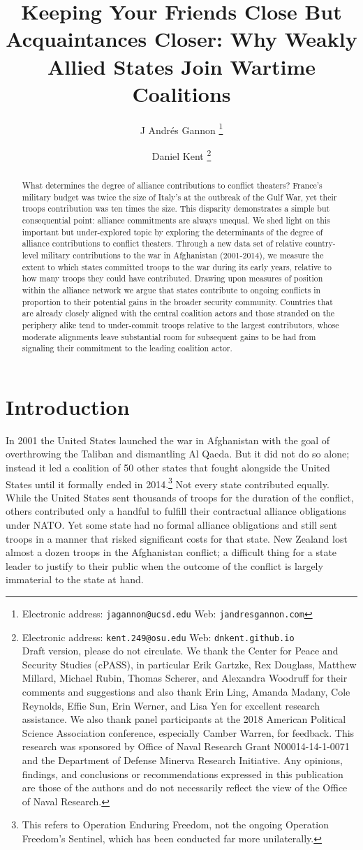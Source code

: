 \documentclass[12pt,letterpaper]{article}
\title{Keeping Your Friends Close But Acquaintances Closer: Why Weakly Allied States Join Wartime Coalitions}
\author{J Andr\'{e}s Gannon%
	\thanks{Electronic address: \texttt{jagannon@ucsd.edu} Web: \texttt{jandresgannon.com}}}
\affil{Department of Political Science \\ University of California, San Diego}
\author{Daniel Kent%
	\thanks{Electronic address: \texttt{kent.249@osu.edu} Web: \texttt{dnkent.github.io} \\ Draft version, please do not circulate. We thank the Center for Peace and Security Studies (cPASS), in particular Erik Gartzke, Rex Douglass, Matthew Millard, Michael Rubin, Thomas Scherer, and Alexandra Woodruff for their comments and suggestions and also thank Erin Ling, Amanda Madany, Cole Reynolds, Effie Sun, Erin Werner, and Lisa Yen for excellent research assistance. We also thank panel participants at the 2018 American Political Science Association conference, especially Camber Warren, for feedback. This research was sponsored by Office of Naval Research Grant N00014-14-1-0071 and the Department of Defense Minerva Research Initiative. Any opinions, findings, and conclusions or recommendations expressed in this publication are those of the authors and do not necessarily reflect the view of the Office of Naval Research.}}
\affil{Department of Political Science \\ The Ohio State University}
\begin{document}
\maketitle

\begin{abstract}
What determines the degree of alliance contributions to conflict theaters? France's military budget was twice the size of Italy's at the outbreak of the Gulf War, yet their troops contribution was ten times the size. This disparity demonstrates a simple but consequential point: alliance commitments are always unequal. We shed light on this important but under-explored topic by exploring the determinants of the degree of alliance contributions to conflict theaters. Through a new data set of relative country-level military contributions to the war in Afghanistan (2001-2014), we measure the extent to which states committed troops to the war during its early years, relative to how many troops they could have contributed. Drawing upon measures of position within the alliance network we argue that states contribute to ongoing conflicts in proportion to their potential gains in the broader security community. Countries that are already closely aligned with the central coalition actors and those stranded on the periphery alike tend to under-commit troops relative to the largest contributors, whose moderate alignments leave substantial room for subsequent gains to be had from signaling their commitment to the leading coalition actor.
\end{abstract}

\doublespacing
\section{Introduction}
	In 2001 the United States launched the war in Afghanistan with the goal of overthrowing the Taliban and dismantling Al Qaeda. But it did not do so alone; instead it led a coalition of 50 other states that fought alongside the United States until it formally ended in 2014.\footnote{This refers to Operation Enduring Freedom, not the ongoing Operation Freedom's Sentinel, which has been conducted far more unilaterally.} Not every state contributed equally. While the United States sent thousands of troops for the duration of the conflict, others contributed only a handful to fulfill their contractual alliance obligations under NATO. Yet some state had no formal alliance obligations and still sent troops in a manner that risked significant costs for that state. New Zealand lost almost a dozen troops in the Afghanistan conflict; a difficult thing for a state leader to justify to their public when the outcome of the conflict is largely immaterial to the state at hand.
\end{document}
